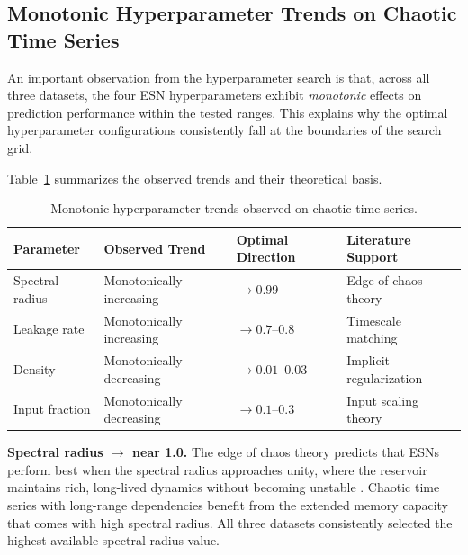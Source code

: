 \subsection{Monotonic Hyperparameter Trends on Chaotic Time Series}
\label{sec:monotonic_trends}

An important observation from the hyperparameter search is that, across all three datasets, the four ESN hyperparameters exhibit \emph{monotonic} effects on prediction performance within the tested ranges. This explains why the optimal hyperparameter configurations consistently fall at the boundaries of the search grid.

Table~\ref{tab:monotonic} summarizes the observed trends and their theoretical basis.

\begin{table}[H]
\centering
\caption{Monotonic hyperparameter trends observed on chaotic time series.}
\label{tab:monotonic}
\small
\begin{tabular}{@{}llll@{}}
\toprule
Parameter & Observed Trend & Optimal Direction & Literature Support \\
\midrule
Spectral radius     & Monotonically increasing & $\to 0.99$ & Edge of chaos theory \cite{bertschinger2004real} \\
Leakage rate        & Monotonically increasing & $\to 0.7$--$0.8$ & Timescale matching \cite{lukosevicius2012practical} \\
Density             & Monotonically decreasing & $\to 0.01$--$0.03$ & Implicit regularization \cite{lukosevicius2009reservoir} \\
Input fraction      & Monotonically decreasing & $\to 0.1$--$0.3$ & Input scaling theory \cite{lukosevicius2012practical} \\
\bottomrule
\end{tabular}
\end{table}

\textbf{Spectral radius $\to$ near 1.0.} The edge of chaos theory predicts that ESNs perform best when the spectral radius approaches unity, where the reservoir maintains rich, long-lived dynamics without becoming unstable \cite{bertschinger2004real}. Chaotic time series with long-range dependencies benefit from the extended memory capacity that comes with high spectral radius. All three datasets consistently selected the highest available spectral radius value.

